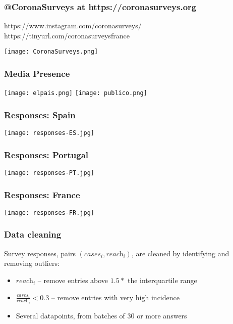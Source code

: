 \documentclass{beamer}
\begin{document}
\begin{frame}
  \frametitle{@CoronaSurveys at https://coronasurveys.org}
  https://www.instagram.com/coronasurveys/\\
  https://tinyurl.com/coronasurveysfrance\\
  \begin{center}
  \texttt{[image: CoronaSurveys.png]}
  \end{center}
\end{frame}

\begin{frame}
\frametitle{Media Presence}
\begin{center}
\texttt{[image: elpais.png]}
\texttt{[image: publico.png]}
\end{center}
\end{frame}
\begin{frame}
  \frametitle{Responses: Spain}
  \begin{center}
  \texttt{[image: responses-ES.jpg]}
  \end{center}
\end{frame}

\begin{frame}
  \frametitle{Responses: Portugal}
  \begin{center}
  \texttt{[image: responses-PT.jpg]}
  \end{center}
\end{frame}


\begin{frame}
  \frametitle{Responses: France}
  \begin{center}
  \texttt{[image: responses-FR.jpg]}
  \end{center}
\end{frame}

\begin{frame}
  \frametitle{Data cleaning}
  Survey responses, pairs  $(\textit{cases}_i,\textit{reach}_i)$, are cleaned by identifying and removing outliers: 
  \begin{itemize}
    \item $\textit{reach}_i$ \--- remove entries above $1.5 *$  the  interquartile  range
    \item $\frac{\textit{cases}_i}{\textit{reach}_i} < 0.3$ \--- remove entries with very high incidence
    \item Several datapoints, from batches of 30 or more answers  
  \end{itemize} 



\end{frame}
\end{document}
